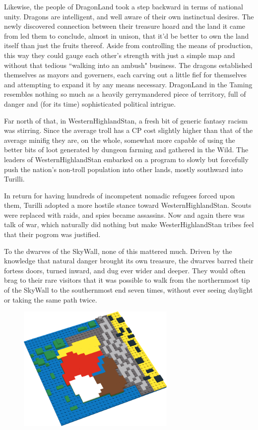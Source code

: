 \documentclass[12pt,a4paper,twocolumn]{article}
\begin{document}
Likewise, the people of DragonLand took a step backward in terms of national unity.  Dragons are intelligent, and well aware of their own instinctual desires.  The newly discovered connection between their treasure hoard and the land it came from led them to conclude, almost in unison, that it'd be better to own the land itself than just the fruits thereof.  Aside from controlling the means of production, this way they could gauge each other's strength with just a simple map and without that tedious ``walking into an ambush" business.  The dragons established themselves as mayors and governers, each carving out a little fief for themselves and attempting to expand it by any means necessary.  DragonLand in the Taming resembles nothing so much as a heavily gerrymandered piece of territory, full of danger and (for its time) sophisticated political intrigue.

Far north of that, in WesternHighlandStan, a fresh bit of generic fantasy racism was stirring.  Since the average troll has a CP cost slightly higher than that of the average minifig they are, on the whole, somewhat more capable of using the better bits of loot generated by dungeon farming and gathered in the Wild.  The leaders of WesternHighlandStan embarked on a program to slowly but forcefully push the nation's non-troll population into other lands, mostly southward into Turilli.

In return for having hundreds of incompetent nomadic refugees forced upon them, Turilli adopted a more hostile stance toward WesternHighlandStan.  Scouts were replaced with raids, and spies became assassins.  Now and again there was talk of war, which naturally did nothing but make WesterHighlandStan tribes feel that their pogrom was justified.

To the dwarves of the SkyWall, none of this mattered much.  Driven by the knowledge that natural danger brought its own treasure, the dwarves barred their fortess doors, turned inward, and dug ever wider and deeper.  They would often brag to their rare visitors that it was possible to walk from the northernmost tip of the SkyWall to the southernmost end seven times, without ever seeing daylight or taking the same path twice.

\begin{figure}[h]
\includegraphics[width=3in]{StruggleNations.png}
\end{figure}
\end{document}
